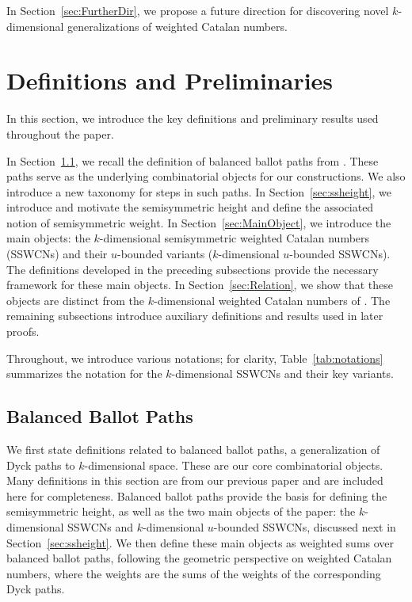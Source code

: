 \documentclass[11pt]{article}
\theoremstyle{remark}
\theoremstyle{definition}
\begin{document}
In Section~\ref{sec:FurtherDir}, we propose a future direction for discovering novel $k$-dimensional generalizations of weighted Catalan numbers.

\section{Definitions and Preliminaries}
\label{section:preliminaries}

In this section, we introduce the key definitions and preliminary results used throughout the paper.

In Section~\ref{sec:bbp}, we recall the definition of balanced ballot paths from \cite{MR5034574}. These paths serve as the underlying combinatorial objects for our constructions. We also introduce a new taxonomy for steps in such paths. In Section~\ref{sec:ssheight}, we introduce and motivate the semisymmetric height and define the associated notion of semisymmetric weight. In Section~\ref{sec:MainObject}, we introduce the main objects: the $k$-dimensional semisymmetric weighted Catalan numbers (SSWCNs) and their $u$-bounded variants ($k$-dimensional $u$-bounded SSWCNs). The definitions developed in the preceding subsections provide the necessary framework for these main objects. In Section~\ref{sec:Relation}, we show that these objects are distinct from the $k$-dimensional weighted Catalan numbers of \cite{MR5034574}. The remaining subsections introduce auxiliary definitions and results used in later proofs. 

Throughout, we introduce various notations; for clarity, Table~\ref{tab:notations} summarizes the notation for the $k$-dimensional SSWCNs and their key variants.
\subsection{Balanced Ballot Paths}\label{sec:bbp}
We first state definitions related to balanced ballot paths, a generalization of Dyck paths to $k$-dimensional space. These are our core combinatorial objects. Many definitions in this section are from our previous paper \cite{MR5034574} and are included here for completeness. Balanced ballot paths provide the basis for defining the semisymmetric height, as well as the two main objects of the paper: the $k$-dimensional SSWCNs and $k$-dimensional $u$-bounded SSWCNs, discussed next in Section~\ref{sec:ssheight}. We then define these main objects as weighted sums over balanced ballot paths, following the geometric perspective on weighted Catalan numbers, where the weights are the sums of the weights of the corresponding Dyck paths.
\end{document}
